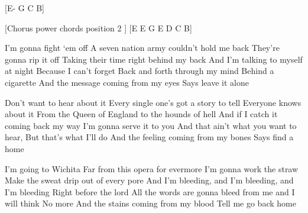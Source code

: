 
\begin{guitar}
	
[E- G C B]

[Chorus power chords position 2 ]
[E E G E D C B]

 I'm gonna fight `em off
A seven nation army couldn't hold me back
They're gonna rip it off
Taking their time right behind my back
And I'm talking to myself at night
Because I can't forget
Back and forth through my mind
Behind a cigarette
And the message coming from my eyes
Says leave it alone

Don't want to hear about it
Every single one's got a story to tell
Everyone knows about it
From the Queen of England to the hounds of hell
And if I catch it coming back my way
I'm gonna serve it to you
And that ain't what you want to hear,
But that's what I'll do
And the feeling coming from my bones
Says find a home

I'm going to Wichita
Far from this opera for evermore
I'm gonna work the straw
Make the sweat drip out of every pore
And I'm bleeding, and I'm bleeding, and I'm bleeding
Right before the lord
All the words are gonna bleed from me and I will think
No more
And the stains coming from my blood
Tell me go back home 

\end{guitar}